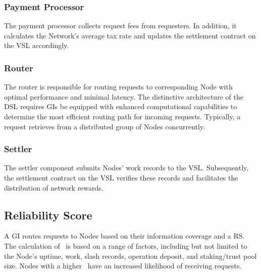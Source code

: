 \subsubsection{Payment Processor}
The payment processor collects request fees from requesters.
In addition, it calculates the Network's average tax rate and updates the settlement contract on the \gls{VSL} accordingly.

\subsubsection{Router}
The router is responsible for routing requests to corresponding \gls{Node} with optimal performance and minimal latency.
The distinctive architecture of the \gls{DSL} requires \glspl{GI} be equipped with enhanced computational capabilities to determine the most efficient routing path for incoming requests.
Typically, a request retrieves  from a distributed group of \glspl{Node} concurrently.

\subsubsection{Settler}
The settler component submits \glspl{Node}' work records to the \gls{VSL}. Subsequently, the settlement contract on the \gls{VSL} verifies these records and facilitates the distribution of network rewards.

\subsection{Reliability Score}

A \gls{GI} routes requests to \glspl{Node} based on their information coverage and a \gls{RS}.
The calculation of \reliabilityScore\ is based on a range of factors, including but not limited to the \gls{Node}'s uptime, work, slash records, operation deposit, and staking/trust pool size.
\glspl{Node} with a higher \reliabilityScore\ have an increased likelihood of receiving requests.